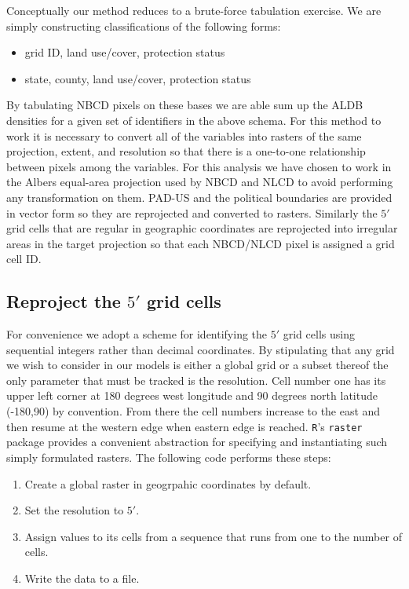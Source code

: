 \documentclass[11pt]{article}
\begin{document}
Conceptually our method reduces to a brute-force tabulation exercise.
We are simply constructing classifications of the following forms:

\begin{itemize}
\item grid ID, land use/cover, protection status
\item state, county, land use/cover, protection status
\end{itemize}

By tabulating NBCD pixels on these bases we are able sum up the ALDB
densities for a given set of identifiers in the above schema.  For
this method to work it is necessary to convert all of the variables
into rasters of the same projection, extent, and resolution so that
there is a one-to-one relationship between pixels among the variables.
For this analysis we have chosen to work in the Albers equal-area
projection used by NBCD and NLCD to avoid performing any
transformation on them.  PAD-US and the political boundaries are
provided in vector form so they are reprojected and converted to
rasters.  Similarly the $5'$ grid cells that are regular in
geographic coordinates are reprojected into irregular areas in the
target projection so that each NBCD/NLCD pixel is assigned a grid
cell ID.
\subsection{Reproject the $5'$ grid cells}
\label{sec-3-1}


For convenience we adopt a scheme for identifying the $5'$ grid cells
using sequential integers rather than decimal coordinates.  By
stipulating that any grid we wish to consider in our models is either
a global grid or a subset thereof the only parameter that must be
tracked is the resolution.  Cell number one has its upper left corner
at 180 degrees west longitude and 90 degrees north latitude (-180,90)
by convention.  From there the cell numbers increase to the east and
then resume at the western edge when eastern edge is reached.  \texttt{R}'s
\texttt{raster} package provides a convenient abstraction for specifying and
instantiating such simply formulated rasters.  The following code
performs these steps:

\begin{enumerate}
\item Create a global raster in geogrpahic coordinates by default.
\item Set the resolution to $5'$.
\item Assign values to its cells from a sequence that runs from one to
   the number of cells.
\item Write the data to a file.
\end{enumerate}
\end{document}

